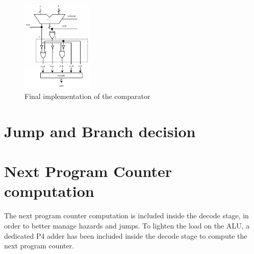 \begin{figure}[H]
	\centering
	\includegraphics[width=0.3\textwidth]{chapters/4_DecodeStage/images/cmp_final.pdf}
	\caption{Final implementation of the comparator}
	\label{cmp_final}
\end{figure}

\section{Jump and Branch decision}
\section{Next Program Counter computation}
The next program counter computation is included inside the decode stage, in order to better manage hazards and jumps. To lighten the load on the ALU, a dedicated P4 adder has been included inside the decode stage to compute the next program counter. 
